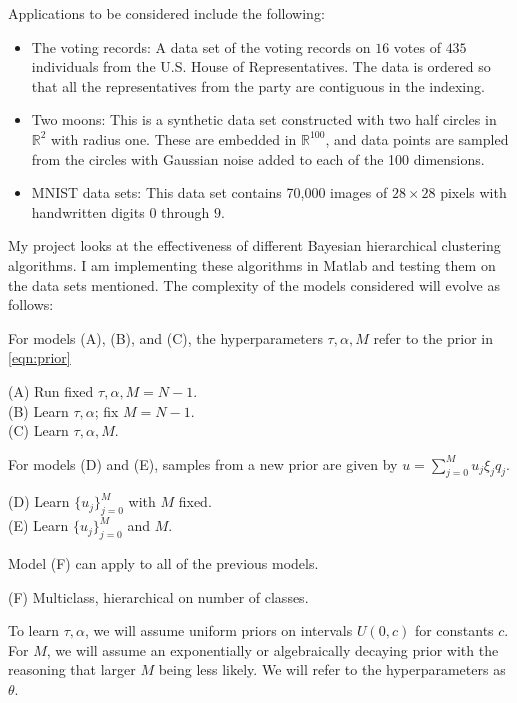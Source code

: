 \documentclass{siamart1116}
\begin{document}
Applications to be considered include the following:
\begin{itemize}
\item The voting records: A data set of the voting records on $16$ votes of $435$ individuals from the U.S. House of Representatives. The data is ordered so that all the representatives from the party are contiguous in the indexing.
\item Two moons: This is a synthetic data set constructed with two half circles in $\mathbb{R}^2$ with radius one. These are embedded in $\mathbb{R}^{100}$, and data points are sampled from the circles with Gaussian noise added to each of the 100 dimensions.
\item MNIST data sets: This data set contains 70,000 images of $28 \times 28$ pixels with handwritten digits $0$ through $9$.
\end{itemize}

My project looks at the effectiveness of different Bayesian hierarchical clustering algorithms. I am implementing these algorithms in Matlab and testing them on the data sets mentioned. The complexity of the models considered will evolve as follows:

For models (A), (B), and (C), the hyperparameters $\tau,\alpha,M$ refer to the prior in \cref{eqn:prior}

(A) Run fixed $\tau,\alpha, M=N-1$.\\
(B) Learn $\tau,\alpha$; fix $M=N-1$.\\
(C) Learn $\tau,\alpha,M$.

For models (D) and (E), samples from a new prior are given by $u = \sum_{j=0}^M u_j\xi_j q_j$.

(D) Learn $\{u_j\}_{j=0}^M$ with $M$ fixed.\\
(E) Learn $\{u_j\}_{j=0}^M$ and $M$.

Model (F) can apply to all of the previous models.

(F) Multiclass, hierarchical on number of classes.

To learn $\tau, \alpha$, we will assume uniform priors on intervals $U(0, c)$ for constants $c$. For $M$, we will assume an exponentially or algebraically decaying prior with the reasoning that larger $M$ being less likely. We will refer to the hyperparameters as $\theta$.
\end{document}
